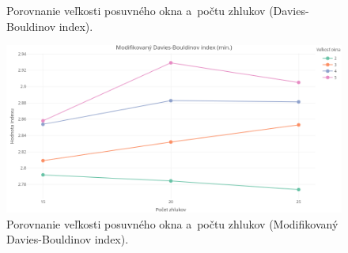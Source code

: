 \documentclass[a4paper,twoside,slovak,12pt,appendix]{article}
\begin{document}
\begin{appendices}
\begin{figure}[htbp]
  \caption{Porovnanie veľkosti posuvného okna a~počtu zhlukov (Davies-Bouldinov index).}
\end{figure}
\begin{figure}[htbp]
  \centering
  \includegraphics[width=\textwidth]{cvi/dtw_basic_workdays_sparse/201902271850-DBstar-dtw_basic_workdays_sparse.png}
  \caption{Porovnanie veľkosti posuvného okna a~počtu zhlukov (Modifikovaný Davies-Bouldinov index).}
\end{figure}


\end{appendices}
\end{document}

